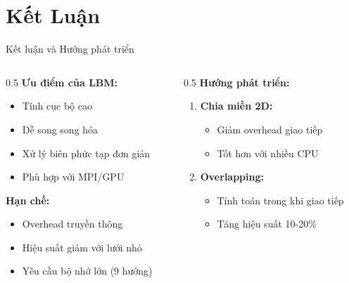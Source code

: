 \documentclass[t, aspectratio=169]{beamer}
\begin{document}
	\section{Kết Luận}
	
	\begin{frame}{Kết luận và Hướng phát triển}
		\begin{columns}[T]
			\begin{column}{0.5\textwidth}
				\textbf{Ưu điểm của LBM:}
				\begin{itemize}
					\item Tính cục bộ cao
					\item Dễ song song hóa
					\item Xử lý biên phức tạp đơn giản
					\item Phù hợp với MPI/GPU
				\end{itemize}
				
				\vspace{1em}
				
				\textbf{Hạn chế:}
				\begin{itemize}
					\item Overhead truyền thông
					\item Hiệu suất giảm với lưới nhỏ
					\item Yêu cầu bộ nhớ lớn (9 hướng)
				\end{itemize}
			\end{column}
			
			\begin{column}{0.5\textwidth}
				\textbf{Hướng phát triển:}
				\begin{enumerate}
					\item \textbf{Chia miền 2D:}
					\begin{itemize}
						\item Giảm overhead giao tiếp
						\item Tốt hơn với nhiều CPU
					\end{itemize}
					
					\item \textbf{Overlapping:}
					\begin{itemize}
						\item Tính toán trong khi giao tiếp
						\item Tăng hiệu suất 10-20\%
					\end{itemize}
					

\end{enumerate}
\end{column}
\end{columns}
\end{frame}
\end{document}
